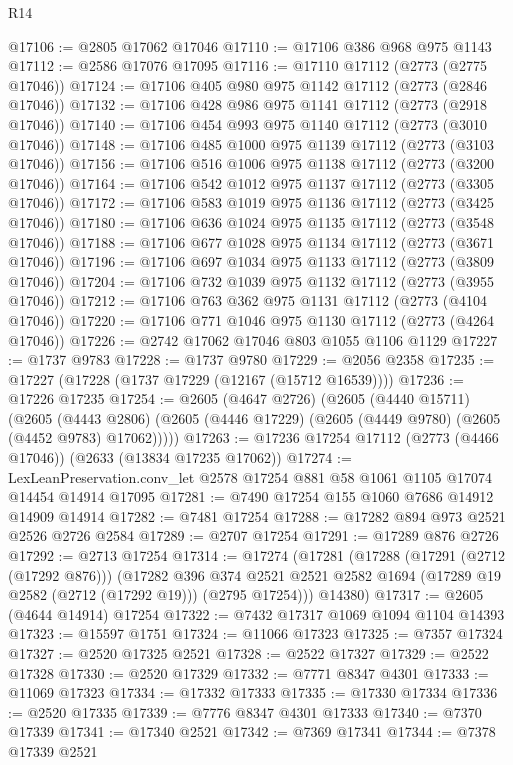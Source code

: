 \begin{lexlean}{R14}
\begin{coremodule}
@17106 := @2805 @17062 @17046
@17110 := @17106 @386 @968 @975 @1143
@17112 := @2586 @17076 @17095
@17116 := @17110 @17112 (@2773 (@2775 @17046))
@17124 := @17106 @405 @980 @975 @1142 @17112 (@2773 (@2846 @17046))
@17132 := @17106 @428 @986 @975 @1141 @17112 (@2773 (@2918 @17046))
@17140 := @17106 @454 @993 @975 @1140 @17112 (@2773 (@3010 @17046))
@17148 := @17106 @485 @1000 @975 @1139 @17112 (@2773 (@3103 @17046))
@17156 := @17106 @516 @1006 @975 @1138 @17112 (@2773 (@3200 @17046))
@17164 := @17106 @542 @1012 @975 @1137 @17112 (@2773 (@3305 @17046))
@17172 := @17106 @583 @1019 @975 @1136 @17112 (@2773 (@3425 @17046))
@17180 := @17106 @636 @1024 @975 @1135 @17112 (@2773 (@3548 @17046))
@17188 := @17106 @677 @1028 @975 @1134 @17112 (@2773 (@3671 @17046))
@17196 := @17106 @697 @1034 @975 @1133 @17112 (@2773 (@3809 @17046))
@17204 := @17106 @732 @1039 @975 @1132 @17112 (@2773 (@3955 @17046))
@17212 := @17106 @763 @362 @975 @1131 @17112 (@2773 (@4104 @17046))
@17220 := @17106 @771 @1046 @975 @1130 @17112 (@2773 (@4264 @17046))
@17226 := @2742 @17062 @17046 @803 @1055 @1106 @1129
@17227 := @1737 @9783
@17228 := @1737 @9780
@17229 := @2056 @2358
@17235 := @17227 (@17228 (@1737 @17229 (@12167 (@15712 @16539))))
@17236 := @17226 @17235
@17254 := @2605
    (@4647 @2726)
    (@2605
      (@4440 @15711)
      (@2605
        (@4443 @2806)
        (@2605 (@4446 @17229) (@2605 (@4449 @9780) (@2605 (@4452 @9783) @17062)))))
@17263 := @17236 @17254 @17112 (@2773 (@4466 @17046)) (@2633 (@13834 @17235 @17062))
@17274 := LexLeanPreservation.conv_let @2578 @17254 @881 @58 @1061 @1105 @17074 @14454 @14914 @17095
@17281 := @7490 @17254 @155 @1060 @7686 @14912 @14909 @14914
@17282 := @7481 @17254
@17288 := @17282 @894 @973 @2521 @2526 @2726 @2584
@17289 := @2707 @17254
@17291 := @17289 @876 @2726
@17292 := @2713 @17254
@17314 := @17274
    (@17281
      (@17288
        (@17291 (@2712 (@17292 @876)))
        (@17282
          @396
          @374
          @2521
          @2521
          @2582
          @1694
          (@17289 @19 @2582 (@2712 (@17292 @19)))
          (@2795 @17254)))
      @14380)
@17317 := @2605 (@4644 @14914) @17254
@17322 := @7432 @17317 @1069 @1094 @1104 @14393
@17323 := @15597 @1751
@17324 := @11066 @17323
@17325 := @7357 @17324
@17327 := @2520 @17325 @2521
@17328 := @2522 @17327
@17329 := @2522 @17328
@17330 := @2520 @17329
@17332 := @7771 @8347 @4301
@17333 := @11069 @17323
@17334 := @17332 @17333
@17335 := @17330 @17334
@17336 := @2520 @17335
@17339 := @7776 @8347 @4301 @17333
@17340 := @7370 @17339
@17341 := @17340 @2521
@17342 := @7369 @17341
@17344 := @7378 @17339 @2521

\end{coremodule}
\end{lexlean}
